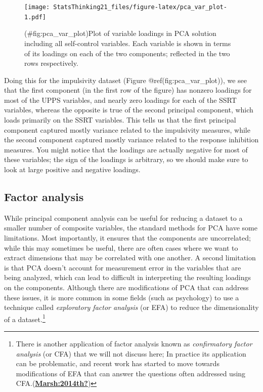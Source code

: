 \documentclass[
  12pt,
]{book}
\begin{document}
\begin{figure}
\centering
\texttt{[image: StatsThinking21\_files/figure-latex/pca\_var\_plot-1.pdf]}
\caption{(\#fig:pca\_var\_plot)Plot of variable loadings in PCA solution including all self-control variables. Each variable is shown in terms of its loadings on each of the two components; reflected in the two rows respectively.}
\end{figure}

Doing this for the impulsivity dataset (Figure @ref(fig:pca\_var\_plot)), we see that the first component (in the first row of the figure) has nonzero loadings for most of the UPPS variables, and nearly zero loadings for each of the SSRT variables, whereas the opposite is true of the second principal component, which loads primarily on the SSRT variables. This tells us that the first principal component captured mostly variance related to the impulsivity measures, while the second component captured mostly variance related to the response inhibition measures. You might notice that the loadings are actually negative for most of these variables; the sign of the loadings is arbitrary, so we should make sure to look at large positive and negative loadings.

\hypertarget{factor-analysis}{%
\subsection{Factor analysis}\label{factor-analysis}}

While principal component analysis can be useful for reducing a dataset to a smaller number of composite variables, the standard methods for PCA have some limitations. Most importantly, it ensures that the components are uncorrelated; while this may sometimes be useful, there are often cases where we want to extract dimensions that may be correlated with one another. A second limitation is that PCA doesn't account for measurement error in the variables that are being analyzed, which can lead to difficult in interpreting the resulting loadings on the components. Although there are modifications of PCA that can address these issues, it is more common in some fields (such as psychology) to use a technique called \emph{exploratory factor analysis} (or EFA) to reduce the dimensionality of a dataset.\footnote{There is another application of factor analysis known as \emph{confirmatory factor analysis} (or CFA) that we will not discuss here; In practice its application can be problematic, and recent work has started to move towards modifications of EFA that can answer the questions often addressed using CFA.(\protect\hyperlink{ref-Marsh:2014th}{\textbf{Marsh:2014th?}})}
\end{document}
